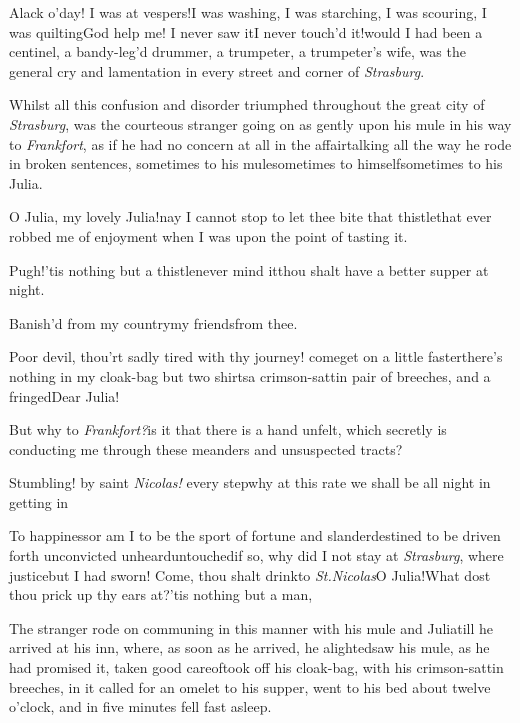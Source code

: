 \documentclass{article}
\begin{document}
Alack o’day! I was at vespers!\tsk I was washing, I was
starching, I was\pb
scouring, I was quilting\tsk God help me!  I never saw
it\tsk I never touch’d it!\tsh would I had been a centinel,
a bandy-leg’d drummer, a trumpeter, a trumpe\-ter’s wife, was
the general cry and la\-men\-t\-ation in every street and corner
of\break
\textit{Strasburg}.

Whilst all this confusion and disorder triumphed throughout the
great city of \textit{Strasburg}, was the courteous stranger going on
as gently upon his mule in his way to \textit{Frankfort}, as if he
had no concern at all in the affair\tsh talking all the
way he rode in broken sentences, sometimes to his
mule\tsk sometimes to himself\tsh sometimes to his Julia.

O Julia, my lovely Julia!\tsk nay I cannot stop to let thee
bite that thistle\tsk that ever \pb robbed me of enjoyment when I was upon the point
of tasting it.\tsk

\tsk Pugh!\tsk ’tis nothing but a thistle\tsk never mind
it\tsk thou shalt have a better supper at night.\tsk

\tsh Banish’d from my country\tsk my friends\tsk from thee.\tsk

Poor devil, thou’rt sadly tired with thy journey!\tsk
come\tsk get on a little faster\tsk there’s nothing in my
cloak-bag but two shirts\tsk a crimson-sattin pair of
breeches, and a fringed\tsk Dear Julia!

\tsh But why to \textit{Frankfort?}\tsk is it that there is
a hand unfelt, which secretly is conducting me through these
meanders and unsuspected tracts?\tsk

\newpage
\tsk Stumbling! by saint \textit{Nicolas!} every step\tsk why at this rate we shall be
all night in getting in\tsh

\tsk To happiness\tsk or am I to be the sport of fortune and
slander\tsk destined to be driven forth unconvicted\tsk
unheard\tsk untouched\tsk if so, why did I not stay at
\textit{Strasburg}, where justice\tsk but I had sworn!\tsk
Come, thou shalt drink\tsk to \textit{St.\@ Nicolas}\tsk O
Julia!\tsh What dost thou prick up thy ears at?\tsh ’tis
nothing but a man, \etc\tsh

The stranger rode on communing in this manner with his mule
and Julia\tsk\break till he arrived at his inn, where, as soon as
he arrived, he alighted\tsk saw his mule, as he had promised
it, taken good care\break of\tsh took off his cloak-bag, with his
crimson-sattin breeches, \etc in it\tsk\pb
called for an omelet
to his supper, went to his bed about twelve o’clock, and in
five minutes fell fast asleep.
\end{document}
